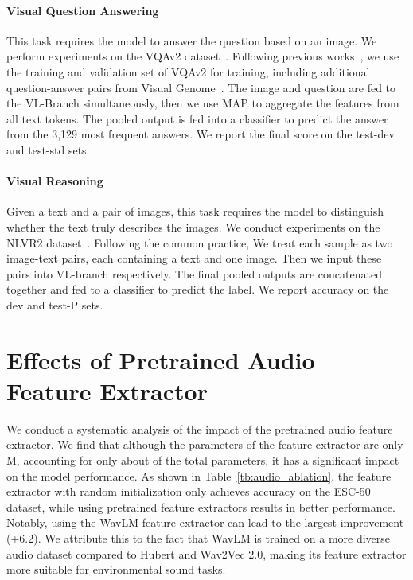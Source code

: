 \documentclass{article}
\begin{document}
\paragraph{Visual Question Answering}
This task requires the model to answer the question based on an image. We perform experiments on the VQAv2 dataset~\cite{vqav2}.
Following previous works~\cite{ofa,albef,blip,x-vlm}, we use the training and validation set of VQAv2 for training, including additional question-answer pairs from Visual Genome~\cite{vg}.
The image and question are fed to the VL-Branch simultaneously, then we use MAP to aggregate the features from all text tokens.
The pooled output is fed into a classifier to predict the answer from the 3,129 most frequent answers.
We report the final score on the test-dev and test-std sets.



\paragraph{Visual Reasoning}
Given a text and a pair of images, this task requires the model to distinguish whether the text truly describes the images. We conduct experiments on the NLVR2 dataset~\cite{nlvr2}.
Following the common practice, We treat each sample as two image-text pairs, each containing a text and one image. Then we input these pairs into VL-branch respectively.
The final pooled outputs are concatenated together and fed to a classifier to predict the label. 
We report accuracy on the dev and test-P sets.























\section{Effects of Pretrained Audio Feature Extractor}
\label{app:audio_feature_extractor}

We conduct a systematic analysis of the impact of the pretrained audio feature extractor.
We find that although the parameters of the feature extractor are only M, accounting for only about  of the total parameters, it has a significant impact on the model performance. 
As shown in Table~\ref{tb:audio_ablation}, the feature extractor with random initialization only achieves  accuracy on the ESC-50 dataset, while using pretrained feature extractors results in better performance. 
Notably, using the WavLM feature extractor can lead to the largest improvement (+6.2).
 We attribute this to the fact that WavLM is trained on a more diverse audio dataset compared to Hubert and Wav2Vec 2.0, making its feature extractor more suitable for environmental sound tasks.
\end{document}
